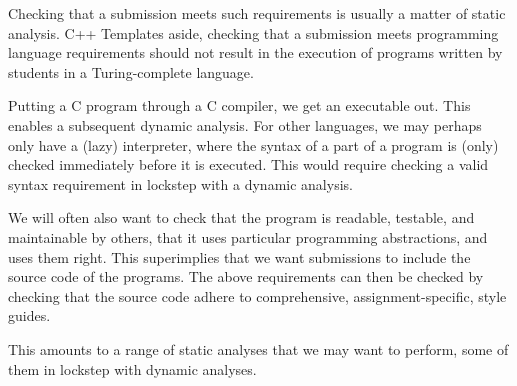 Checking that a submission meets such requirements is usually a matter of
static analysis. C++ Templates aside\cite{veldhuizen-2003}, checking that a
submission meets programming language requirements should not result in the
execution of programs written by students in a Turing-complete language.

Putting a C program through a C compiler, we get an executable out. This
enables a subsequent dynamic analysis. For other languages, we may perhaps only
have a (lazy) interpreter, where the syntax of a part of a program is (only)
checked immediately before it is executed. This would require checking a valid
syntax requirement in lockstep with a dynamic analysis.

We will often also want to check that the program is readable, testable, and
maintainable by others, that it uses particular programming abstractions, and
uses them right. This superimplies that we want submissions to include the
source code of the programs. The above requirements can then be checked by
checking that the source code adhere to comprehensive, assignment-specific,
style guides.

This amounts to a range of static analyses that we may want to perform, some of
them in lockstep with dynamic analyses.
